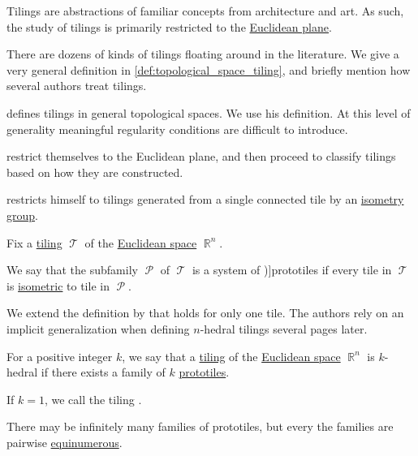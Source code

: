 \begin{remark}\label{rem:tiling_definition}
  Tilings are abstractions of familiar concepts from architecture and art. As such, the study of tilings is primarily restricted to the \hyperref[def:euclidean_plane]{Euclidean plane}.

  There are dozens of kinds of tilings floating around in the literature. We give a very general definition in \cref{def:topological_space_tiling}, and briefly mention how several authors treat tilings.

  \begin{thmenum}
      defines tilings in general topological spaces. We use his definition. At this level of generality meaningful regularity conditions are difficult to introduce.

      restrict themselves to the Euclidean plane, and then proceed to classify tilings based on how they are constructed.

      restricts himself to tilings generated from a single connected tile by an \hyperref[def:isometry_group]{isometry group}.
  \end{thmenum}
\end{remark}

\begin{definition}\label{def:prototile}\mimprovised
  Fix a \hyperref[def:topological_space_tiling]{tiling} \( \mscrT \) of the \hyperref[def:euclidean_space]{Euclidean space} \( \BbbR^n \).

  We say that the subfamily \( \mscrP \) of \( \mscrT \) is a system of \term[en=prototile (\cite[20]{GrünbaumShephard1987TilingsAndPatterns})]{prototiles} if every tile in \( \mscrT \) is \hyperref[def:isometry]{isometric} to  tile in \( \mscrP \).
\end{definition}
\begin{comments}
  \item We extend the definition by  that holds for only one tile. The authors rely on an implicit generalization when defining \( n \)-hedral tilings several pages later.
\end{comments}

\begin{definition}\label{def:k_hedral_tiling}
  For a positive integer \( k \), we say that a \hyperref[def:topological_space_tiling]{tiling} of the \hyperref[def:euclidean_space]{Euclidean space} \( \BbbR^n \) is \( k \)-hedral if there exists a family of \( k \) \hyperref[def:prototile]{prototiles}.

  If \( k = 1 \), we call the tiling .
\end{definition}
\begin{defproof}
  There may be infinitely many families of prototiles, but every the families are pairwise \hyperref[def:equinumerosity]{equinumerous}.
\end{defproof}

